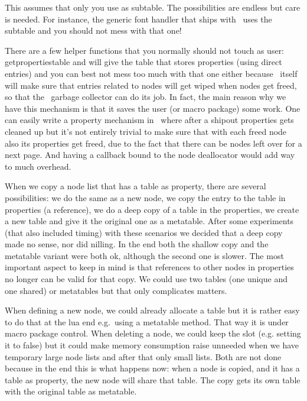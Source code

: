 \starttyping
{}
\stoptyping

This assumes that only you use  as subtable. The possibilities are
endless but care is needed. For instance, the generic font handler that ships
with \CONTEXT\ uses the  subtable and you should not mess with
that one!

There are a few helper functions that you normally should not touch as user: \typ
{getpropertiestable} and will give the table that stores properties (using
direct entries) and you can best not mess too much with that one either because
\LUAMETATEX\ itself will make sure that entries related to nodes will get wiped when
nodes get freed, so that the \LUA\ garbage collector can do its job. In fact, the
main reason why we have this mechanism is that it saves the user (or macro
package) some work. One can easily write a property mechanism in \LUA\ where
after a shipout properties gets cleaned up but it's not entirely trivial to make
sure that with each freed node also its properties get freed, due to the fact
that there can be nodes left over for a next page. And having a callback bound to
the node deallocator would add way to much overhead.

When we copy a node list that has a table as property, there are several
possibilities: we do the same as a new node, we copy the entry to the table in
properties (a reference), we do a deep copy of a table in the properties, we
create a new table and give it the original one as a metatable. After some
experiments (that also included timing) with these scenarios we decided that a
deep copy made no sense, nor did nilling. In the end both the shallow copy and
the metatable variant were both ok, although the second one is slower. The most
important aspect to keep in mind is that references to other nodes in properties
no longer can be valid for that copy. We could use two tables (one unique and one
shared) or metatables but that only complicates matters.

When defining a new node, we could already allocate a table but it is rather easy
to do that at the lua end e.g.\ using a metatable  method. That
way it is under macro package control. When deleting a node, we could keep the
slot (e.g. setting it to false) but it could make memory consumption raise
unneeded when we have temporary large node lists and after that only small lists.
Both are not done because in the end this is what happens now: when a node is
copied, and it has a table as property, the new node will share that table. The
copy gets its own table with the original table as metatable.

